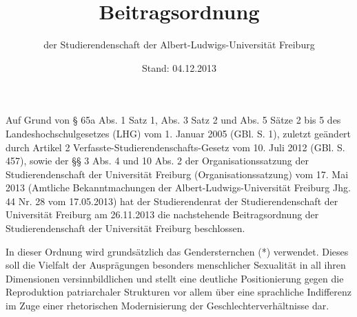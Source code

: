 \documentclass[fontsize=12pt,parskip=half]{scrartcl}
\begin{document}
\subject{Lesefassung}
\title{Beitragsordnung}
\subtitle{der Studierendenschaft der Albert-Ludwigs-Universität Freiburg}
\date{Stand: 04.12.2013}
\maketitle

\pagebreak

\tableofcontents

\vspace*{\fill}

Auf Grund von § 65a Abs. 1 Satz 1, Abs. 3 Satz 2 und Abs. 5 Sätze 2 bis 5 des
Landeshochschulgesetzes (LHG) vom 1. Januar 2005 (GBl. S. 1), zuletzt geändert
durch Artikel 2 Verfasste-Studierendenschafts-Gesetz vom 10. Juli 2012 (GBl. S.
457), sowie der §§ 3 Abs. 4 und 10 Abs. 2 der Organisationssatzung der
Studierendenschaft der Universität Freiburg (Organisationssatzung) vom 17. Mai
2013 (Amtliche Bekanntmachungen der Albert-Ludwigs-Universität Freiburg Jhg. 44
Nr. 28 vom 17.05.2013) hat der Studierendenrat der Studierendenschaft der
Universität Freiburg am 26.11.2013 die nachstehende Beitragsordnung der
Studierendenschaft der Universität Freiburg beschlossen.

In dieser Ordnung wird grundsätzlich das Gendersternchen (*) verwendet. Dieses
soll die Vielfalt der Ausprägungen besonders menschlicher Sexualität in all
ihren Dimensionen versinnbildlichen und stellt eine deutliche Positionierung
gegen die Reproduktion patriarchaler Strukturen vor allem über eine sprachliche
Indifferenz im Zuge einer rhetorischen Modernisierung der
Geschlechterverhältnisse dar.

\pagebreak
\end{document}
